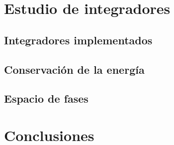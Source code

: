 \documentclass[twoside, 12pt]{article}
\begin{document}
\section{Estudio de integradores}

\subsection{Integradores implementados}

\subsection{Conservación de la energía}

\subsection{Espacio de fases}



\section{Conclusiones}
\end{document}

